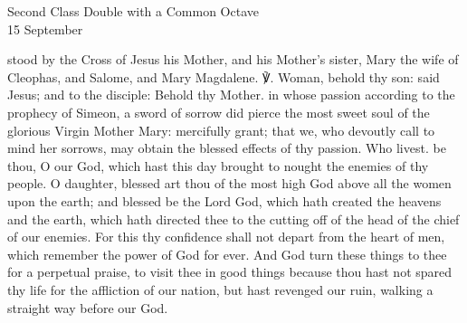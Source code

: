 \begin{inhead}
    {Second Class Double with a Common Octave\\
15 September}
\end{inhead}

\introit
{} stood by the Cross of Jesus his Mother, and his Mother's sister, Mary the wife of Cleophas, and Salome, and Mary Magdalene. ℣. Woman, behold thy son: said Jesus; and to the disciple: Behold thy Mother.
\collect
{} in whose passion according to the prophecy of Simeon, a sword of sorrow did pierce the most sweet soul of the glorious Virgin Mother Mary: mercifully grant; that we, who devoutly call to mind her sorrows, may obtain the blessed effects of thy passion. Who livest.
 be thou, O our God, which hast this day brought to nought the enemies of thy people. O daughter, blessed art thou of the most high God above all the women upon the earth; and blessed be the Lord God, which hath created the heavens and the earth, which hath directed thee to the cutting off of the head of the chief of our enemies. For this thy confidence shall not depart from the heart of men, which remember the power of God for ever. And God turn these things to thee for a perpetual praise, to visit thee in good things because thou hast not spared thy life for the affliction of our nation, but hast revenged our ruin, walking a straight way before our God.
\label{dolorosa}
